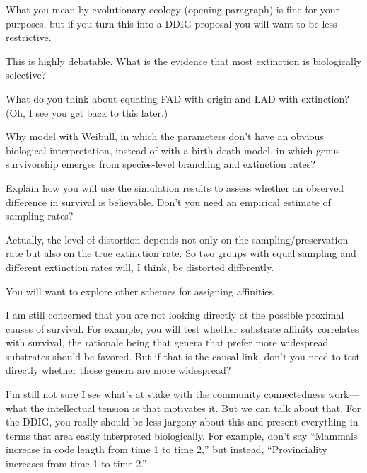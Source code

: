 \documentclass{article}
\begin{document}
What you mean by evolutionary ecology (opening paragraph) is fine for your purposes, but if you turn this into a DDIG proposal you will want to be less restrictive.

This is highly debatable.  What is the evidence that most extinction is biologically selective?

What do you think about equating FAD with origin and LAD with extinction?  (Oh, I see you get back to this later.)

Why model with Weibull, in which the parameters don't have an obvious biological interpretation, instead of with a birth-death model, in which genus survivorship emerges from species-level branching and extinction rates?

Explain how you will use the simulation results to assess whether an observed difference in survival is believable.  Don't you need an empirical estimate of sampling rates?

Actually, the level of distortion depends not only on the sampling/preservation rate but also on the true extinction rate.  So two groups with equal sampling and different extinction rates will, I think, be distorted differently.

You will want to explore other schemes for assigning affinities.

I am still concerned that you are not looking directly at the possible proximal causes of survival.  For example, you will test whether substrate affinity correlates with survival, the rationale being that genera that prefer more widespread substrates should be favored.  But if that is the causal link, don't you need to test directly whether those genera are more widespread?

I'm still not sure I see what's at stake with the community connectedness work---what the intellectual tension is that motivates it.  But we can talk about that.  For the DDIG, you really should be less jargony about this and present everything in terms that area easily interpreted biologically.   For example, don't say ``Mammals increase in code length from time 1 to time 2,'' but instead, ``Provinciality increases from time 1 to time 2.''
\end{document}
